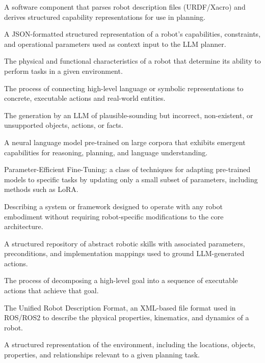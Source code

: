 \documentclass[12pt,a4paper]{article}
\begin{document}
\begin{singlespace}
\begin{description}[leftmargin=4.5cm, style=nextline, labelwidth=4cm, font=\bfseries]
  \item[Capability Extractor]
    A software component that parses robot description files (URDF/Xacro) and derives structured capability representations for use in planning.
  \item[Capability JSON]
    A JSON-formatted structured representation of a robot's capabilities, constraints, and operational parameters used as context input to the LLM planner.
  \item[Embodiment]
    The physical and functional characteristics of a robot that determine its ability to perform tasks in a given environment.
  \item[Grounding]
    The process of connecting high-level language or symbolic representations to concrete, executable actions and real-world entities.
  \item[Hallucination (LLM)]
    The generation by an LLM of plausible-sounding but incorrect, non-existent, or unsupported objects, actions, or facts.
  \item[Large Language Model]
    A neural language model pre-trained on large corpora that exhibits emergent capabilities for reasoning, planning, and language understanding.
  \item[PEFT]
    Parameter-Efficient Fine-Tuning: a class of techniques for adapting pre-trained models to specific tasks by updating only a small subset of parameters, including methods such as LoRA.
  \item[Robot-agnostic]
    Describing a system or framework designed to operate with any robot embodiment without requiring robot-specific modifications to the core architecture.
  \item[Skills Library]
    A structured repository of abstract robotic skills with associated parameters, preconditions, and implementation mappings used to ground LLM-generated actions.
  \item[Task Planning]
    The process of decomposing a high-level goal into a sequence of executable actions that achieve that goal.
  \item[URDF]
    The Unified Robot Description Format, an XML-based file format used in ROS/ROS2 to describe the physical properties, kinematics, and dynamics of a robot.
  \item[World State]
    A structured representation of the environment, including the locations, objects, properties, and relationships relevant to a given planning task.
\end{description}
\end{singlespace}
\end{document}
